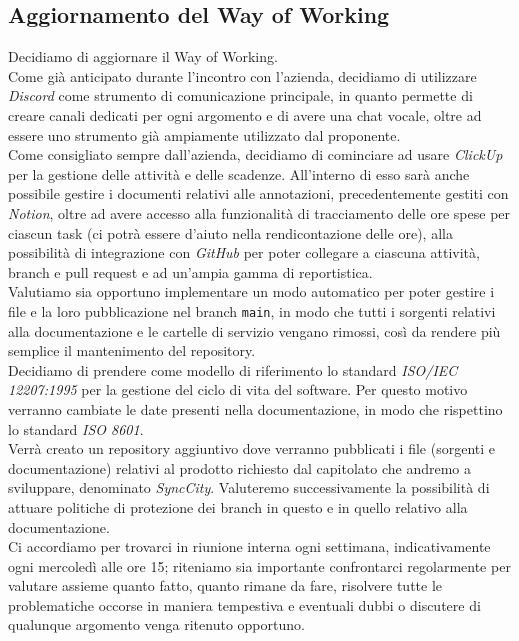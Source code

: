 \documentclass[italian,12pt]{article}
\begin{document}
\subsection{Aggiornamento del Way of Working}
Decidiamo di aggiornare il Way of Working. \\
Come già anticipato durante l'incontro con l'azienda, decidiamo di utilizzare \textit{Discord} come strumento di comunicazione principale, in quanto permette di creare canali dedicati per ogni argomento e di avere una chat vocale, oltre ad essere uno strumento già ampiamente utilizzato dal proponente. \\
Come consigliato sempre dall'azienda, decidiamo di cominciare ad usare \textit{ClickUp} per la gestione delle attività e delle scadenze. All'interno di esso sarà anche possibile gestire i documenti relativi alle annotazioni, precedentemente gestiti con \textit{Notion}, oltre ad avere accesso alla funzionalità di tracciamento delle ore spese per ciascun task (ci potrà essere d'aiuto nella rendicontazione delle ore), alla possibilità di integrazione con \textit{GitHub} per poter collegare a ciascuna attività, branch e pull request e ad un'ampia gamma di reportistica. \\
Valutiamo sia opportuno implementare un modo automatico per poter gestire i file e la loro pubblicazione nel branch \texttt{main}, in modo che tutti i sorgenti relativi alla documentazione e le cartelle di servizio vengano rimossi, così da rendere più semplice il mantenimento del repository. \\
Decidiamo di prendere come modello di riferimento lo standard \textit{ISO/IEC 12207:1995} per la gestione del ciclo di vita del software. Per questo motivo verranno cambiate le date presenti nella documentazione, in modo che rispettino lo standard \textit{ISO 8601}. \\
Verrà creato un repository aggiuntivo dove verranno pubblicati i file (sorgenti e documentazione) relativi al prodotto 
richiesto dal capitolato che andremo a sviluppare, denominato \textit{SyncCity}. Valuteremo successivamente 
la possibilità di attuare politiche di protezione dei branch in questo e in quello relativo alla documentazione. \\
Ci accordiamo per trovarci in riunione interna ogni settimana, indicativamente ogni mercoledì alle ore 15; riteniamo sia importante confrontarci regolarmente per valutare assieme quanto fatto, quanto rimane da fare, risolvere tutte le problematiche occorse in maniera tempestiva e eventuali dubbi o discutere di qualunque argomento venga ritenuto opportuno.
\end{document}
